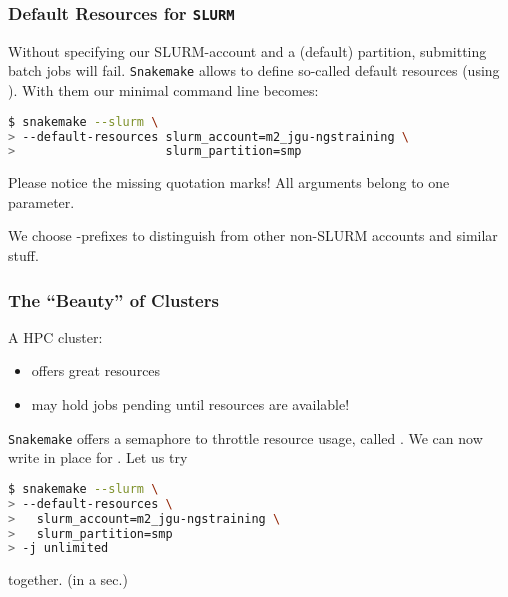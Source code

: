 \begin{frame}[fragile]
  \frametitle{Default Resources for \texttt{SLURM}}
  Without specifying our SLURM-account and a (default) partition, submitting batch jobs will fail. \texttt{Snakemake} allows to define so-called default resources (using ). With them our minimal command line becomes:
  \begin{lstlisting}[language=Bash, style=Shell, basicstyle=\footnotesize]
$ snakemake --slurm \
> --default-resources slurm_account=m2_jgu-ngstraining \
>                     slurm_partition=smp
  \end{lstlisting}
  \begin{hint}
  	Please notice the missing quotation marks! All arguments belong to one parameter.
  \end{hint}
  \begin{docs}
  	We choose -prefixes to distinguish from other non-SLURM accounts and similar stuff.
  \end{docs}
\end{frame}

\begin{frame}[fragile]
  \frametitle{The ``Beauty'' of Clusters}
  A HPC cluster:
  \begin{itemize}
   \item offers great resources
   \item may hold jobs pending until resources are available!
  \end{itemize}
  \pause
  \texttt{Snakemake} offers a semaphore to throttle resource usage, called . We can now write  in place for . Let us try
  \begin{lstlisting}[language=Bash, style=Shell, basicstyle=\footnotesize]
$ snakemake --slurm \
> --default-resources \ 
>   slurm_account=m2_jgu-ngstraining \
>   slurm_partition=smp
> -j unlimited
  \end{lstlisting}
  together. (in a sec.)
\end{frame}

